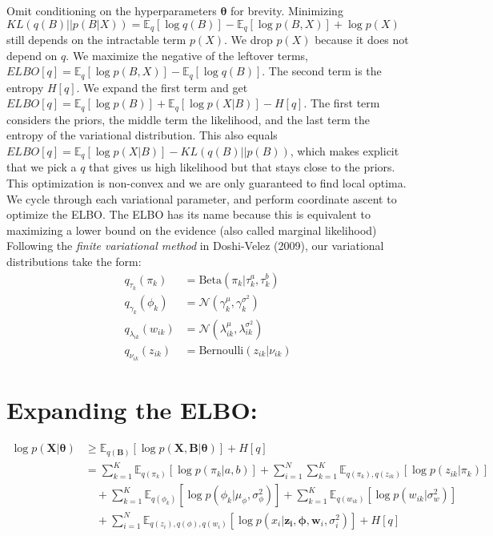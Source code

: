 \documentclass[11pt]{article}
\theoremstyle{definition}
\theoremstyle{plain}
\newcommand{\E}{\mathbb{E}}
\newcommand{\Beta}{\text{Beta}}
\newcommand{\Bernoulli}{\text{Bernoulli}}
\begin{document}
\noindent Omit conditioning on the hyperparameters $\boldsymbol{\theta}$ for brevity.
Minimizing $KL(q(B)||p(B|X)) = \E_q[\log q(B)] - \E_q[\log p(B,X)] + \log p(X)$ still depends on the intractable term $p(X)$. We drop $p(X)$ because
it does not depend on $q$. We maximize the negative of the leftover terms, $ELBO[q] = \E_q[\log p(B,X)] - \E_q[\log q(B)]$. The second term is the entropy $H[q]$.
We expand the first term and get $ELBO[q] = \E_q[\log p(B)] + \E_q[\log p(X|B)] - H[q]$. The first term considers the priors, the middle term the likelihood, and the last term
the entropy of the variational distribution. This also equals $ELBO[q] = \E_q[\log p(X|B)] - KL(q(B) || p(B))$, which makes explicit that we pick a $q$ that gives us high likelihood
but that stays close to the priors. This optimization is non-convex and we are only guaranteed to find local optima. We cycle through each variational parameter, and perform coordinate ascent 
to optimize the ELBO. The ELBO has its name because this is equivalent to maximizing a lower bound on the evidence (also called marginal likelihood)\\

\noindent Following the \textit{finite variational method} in Doshi-Velez (2009), our variational distributions take the form:
\begin{align*}
    q_{\tau_k}(\pi_k) &= \Beta(\pi_k|\tau_k^a, \tau_k^b)\\
    q_{\gamma_k}(\phi_k) &= \mathcal{N}(\gamma_{k}^{\mu}, \gamma_{k}^{\sigma^2})\\
    q_{\lambda_{ik}}(w_{ik}) &= \mathcal{N}(\lambda_{ik}^{\mu}, \lambda_{ik}^{\sigma^2})\\
    q_{\nu_{ik}}(z_{ik}) &= \Bernoulli(z_{ik}|\nu_{ik})
\end{align*}

\section{Expanding the ELBO:}

\begin{align*}
    \log p (\mathbf{X}|\boldsymbol{\theta}) &\geq \E_{q(\mathbf{B})}[\log p(\mathbf{X,B} | \boldsymbol{\theta})] + H[q]\\
                                       &= \sum_{k=1}^K \E_{q(\pi_k)}[\log p(\pi_k|a,b)] 
    + \sum_{i=1}^N \sum_{k=1}^K \E_{q(\pi_k),q(z_{ik})}[\log p(z_{ik}|\pi_k)]\\
    &\quad + \sum_{k=1}^K \E_{q(\phi_k)}[\log p(\phi_k|\mu_{\phi},\sigma^2_\phi)] + \sum_{k=1}^K \E_{q(w_{ik})}[ \log p(w_{ik}|\sigma^2_w)]\\
    &\quad + \sum_{i=1}^N \E_{q(z_i),q(\phi),q(w_i)}[\log p(x_i | \mathbf{z_i}, \boldsymbol{\phi}, \mathbf{w}_i, \sigma^2_i)] + H[q]
\end{align*}
\end{document}
